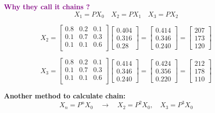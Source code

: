 \documentclass[letterpaper, 10.5pt,landscape]{article}
\begin{document}
\begin{multicols*}{3}
\textcolor{purple}{\textbf{Why they call it chains
?}}
\vspace{-3pt}
\[X_{1} = PX_{0} \quad X_{2} = PX_{1} \quad X_{3} = PX_{2} \]

\vspace{-5pt}
\[ X_{2} = 
\begin{bmatrix}
  0.8 & 0.2 & 0.1 \\
  0.1 & 0.7 & 0.3 \\
  0.1 & 0.1 & 0.6 \\
\end{bmatrix}
\begin{bmatrix}
0.404 \\
0.316 \\
0.28
\end{bmatrix}
=
\begin{bmatrix}
0.414 \\
0.346 \\
0.240
\end{bmatrix} 
= 
\begin{bmatrix}
207 \\
173 \\
120
\end{bmatrix}
\]


\vspace{-3pt}
\[ X_{3} = 
\begin{bmatrix}
  0.8 & 0.2 & 0.1 \\
  0.1 & 0.7 & 0.3 \\
  0.1 & 0.1 & 0.6 \\
\end{bmatrix}
\begin{bmatrix}
0.414 \\
0.346 \\
0.240
\end{bmatrix} 
=
\begin{bmatrix}
0.424 \\
0.356 \\
0.220
\end{bmatrix} 
= 
\begin{bmatrix}
212 \\
178 \\
110
\end{bmatrix}
\]


\textbf{Another method to calculate chain:}
\vspace{-3pt}
\[X_{n} = P^{n}X_{0} \quad \rightarrow \quad X_{2} = P^{2}X_{0}, \quad X_{3} = P^{3}X_{0} \]


\end{multicols*}
\end{document}
